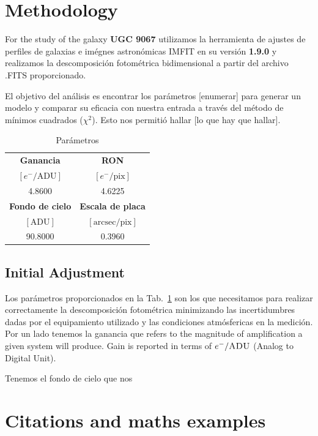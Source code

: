\documentclass{aa}
\begin{document}
\section{Methodology}

For the study of the galaxy \textbf{UGC 9067} utilizamos la herramienta de ajustes de perfiles de galaxias e imégnes astronómicas \textsc{IMFIT} en su versión \textbf{1.9.0} y realizamos la descomposición fotométrica bidimensional a partir del archivo \textsc{.FITS} proporcionado.

El objetivo del análisis es encontrar los parámetros [enumerar] para generar un modelo y comparar su eficacia con nuestra entrada a través del método de mínimos cuadrados ($\chi^2$). Esto nos permitió hallar [lo que hay que hallar]. 

\begin{table}[h!]
\caption{Parámetros}                 %
\label{table:iparameters}    %
\centering
\begin{tabular}{c c}
\hline\hline
\textbf{Ganancia} & \textbf{RON} \\
$[e^-/\mathrm{ADU}]$ & $[e^-/\mathrm{pix}]$ \\
4.8600 & 4.6225 \\
\hline
\textbf{Fondo de cielo} & \textbf{Escala de placa} \\
$[\mathrm{ADU}]$ & $[\mathrm{arcsec}/\mathrm{pix}]$ \\
90.8000 & 0.3960 \\
\hline
\end{tabular}
\end{table}





\subsection{Initial Adjustment}
Los parámetros proporcionados en la Tab.~\ref{table:iparameters} son los que necesitamos para realizar correctamente la descomposición fotométrica minimizando las incertidumbres dadas por el equipamiento utilizado y las condiciones atmósfericas en la medición.
Por un lado tenemos la ganancia que refers to the magnitude of amplification a given system will produce. Gain is reported in terms of $e^-/\textsc{ADU}$ (Analog to Digital Unit).

Tenemos el fondo de cielo que nos
\section{Citations and maths examples}
\end{document}
